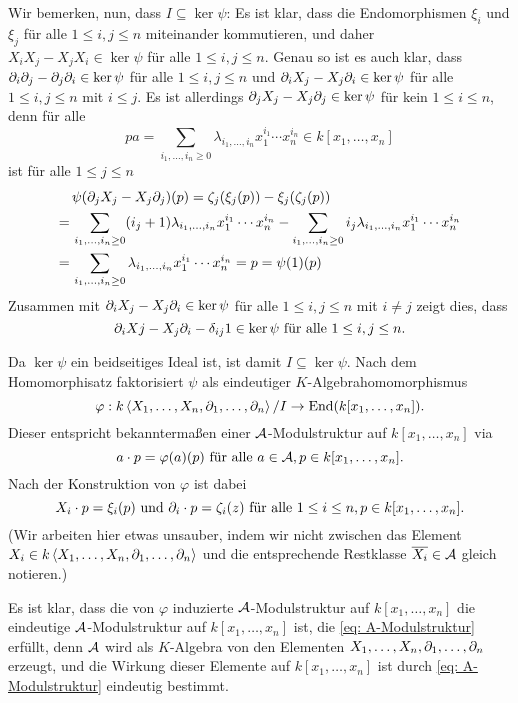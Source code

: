 \documentclass[a4paper,10pt]{article}
\begin{document}
Wir bemerken, nun, dass $I \subseteq \ker \psi$: Es ist klar, dass die Endomorphismen $\xi_i$ und $\xi_j$ für alle $1 \leq i, j \leq n$ miteinander kommutieren, und daher $X_i X_j - X_j X_i \in \ker \psi$ für alle $1 \leq i,j \leq n$. Genau so ist es auch klar, dass $\partial_i \partial_j - \partial_j \partial_i \in \ker \psi$ für alle $1 \leq i,j \leq n$ und $\partial_i X_j - X_j \partial_i \in \ker \psi$ für alle $1 \leq i,j \leq n$ mit $i \leq j$. Es ist allerdings $\partial_j X_j - X_j \partial_j \in \ker \psi$ für kein $1 \leq i \leq n$, denn für alle
\[
 p
 a= \sum_{i_1, \ldots, i_n \geq 0} \lambda_{i_1, \ldots, i_n} x_1^{i_1} \cdots x_n^{i_n} \in k[x_1, \ldots, x_n]
\]
ist für alle $1 \leq j \leq n$
\begin{align*}
  &\,\psi(\partial_j X_j - X_j \partial_j)(p) 
 =   \zeta_j(\xi_j(p)) - \xi_j(\zeta_j(p)) \\
 =&\, \sum_{i_1, \ldots, i_n \geq 0} (i_j+1) \lambda_{i_1, \ldots, i_n} x_1^{i_1} \cdots x_n^{i_n}
 - \sum_{i_1, \ldots, i_n \geq 0} i_j \lambda_{i_1, \ldots, i_n} x_1^{i_1} \cdots x_n^{i_n} \\
 =&\, \sum_{i_1, \ldots, i_n \geq 0} \lambda_{i_1, \ldots, i_n} x_1^{i_1} \cdots x_n^{i_n}
 = p
 = \psi(1)(p)
\end{align*}
Zusammen mit $\partial_i X_j - X_j \partial_i \in \ker \psi$ für alle $1 \leq i, j \leq n$ mit $i \neq j$ zeigt dies, dass
\[
 \partial_i Xj - X_j \partial_i - \delta_{ij} 1 \in \ker \psi \text{ für alle } 1 \leq i,j \leq n.
\]

Da $\ker \psi$ ein beidseitiges Ideal ist, ist damit $I \subseteq \ker \psi$. Nach dem Homomorphisatz faktorisiert $\psi$ als eindeutiger $K$-Algebrahomomorphismus
\[
 \varphi : k\left\langle X_1, \ldots, X_n, \partial_1, \ldots, \partial_n \right\rangle/I \to \operatorname{End}(k[x_1, \ldots, x_n]).
\]
Dieser entspricht bekanntermaßen einer $\mathcal{A}$-Modulstruktur auf $k[x_1, \ldots, x_n]$ via
\[
 a \cdot p = \varphi(a)(p) \text{ für alle } a \in \mathcal{A}, p \in k[x_1, \ldots, x_n].
\]
Nach der Konstruktion von $\varphi$ ist dabei
\begin{equation}\label{eq: A-Modulstruktur}
 X_i \cdot p = \xi_i(p) \text{ und } \partial_i \cdot p = \zeta_i(z)
 \text{ für alle } 1 \leq i \leq n, p \in k[x_1, \ldots, x_n].
\end{equation}
(Wir arbeiten hier etwas unsauber, indem wir nicht zwischen das Element $X_i \in k\left\langle X_1, \ldots, X_n, \partial_1, \ldots, \partial_n \right\rangle$ und die entsprechende Restklasse $\overline{X_i} \in \mathcal{A}$ gleich notieren.)

Es ist klar, dass die von $\varphi$ induzierte $\mathcal{A}$-Modulstruktur auf $k[x_1, \ldots, x_n]$ die eindeutige $\mathcal{A}$-Modulstruktur auf $k[x_1, \ldots, x_n]$ ist, die \eqref{eq: A-Modulstruktur} erfüllt, denn $\mathcal{A}$ wird als $K$-Algebra von den Elementen $X_1, \ldots, X_n, \partial_1, \ldots, \partial_n$ erzeugt, und die Wirkung dieser Elemente auf $k[x_1, \ldots, x_n]$ ist durch \eqref{eq: A-Modulstruktur} eindeutig bestimmt.
\end{document}
